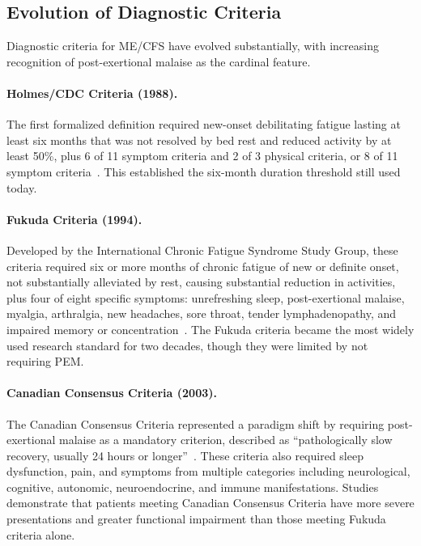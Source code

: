 \subsection{Evolution of Diagnostic Criteria}
\label{subsec:criteria-evolution}

Diagnostic criteria for ME/CFS have evolved substantially, with increasing recognition of post-exertional malaise as the cardinal feature.

\paragraph{Holmes/CDC Criteria (1988).}
The first formalized definition required new-onset debilitating fatigue lasting at least six months that was not resolved by bed rest and reduced activity by at least 50\%, plus 6 of 11 symptom criteria and 2 of 3 physical criteria, or 8 of 11 symptom criteria~\cite{Holmes1988}. This established the six-month duration threshold still used today.

\paragraph{Fukuda Criteria (1994).}
Developed by the International Chronic Fatigue Syndrome Study Group, these criteria required six or more months of chronic fatigue of new or definite onset, not substantially alleviated by rest, causing substantial reduction in activities, plus four of eight specific symptoms: unrefreshing sleep, post-exertional malaise, myalgia, arthralgia, new headaches, sore throat, tender lymphadenopathy, and impaired memory or concentration~\cite{Fukuda1994}. The Fukuda criteria became the most widely used research standard for two decades, though they were limited by not requiring PEM.

\paragraph{Canadian Consensus Criteria (2003).}
The Canadian Consensus Criteria represented a paradigm shift by requiring post-exertional malaise as a mandatory criterion, described as ``pathologically slow recovery, usually 24 hours or longer''~\cite{Carruthers2003}. These criteria also required sleep dysfunction, pain, and symptoms from multiple categories including neurological, cognitive, autonomic, neuroendocrine, and immune manifestations. Studies demonstrate that patients meeting Canadian Consensus Criteria have more severe presentations and greater functional impairment than those meeting Fukuda criteria alone.

